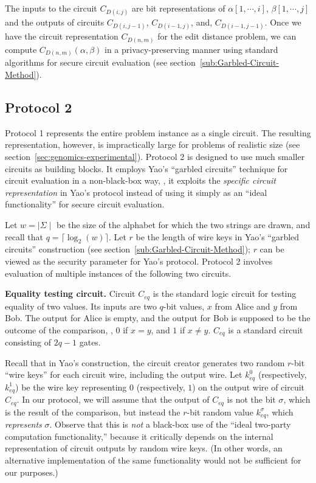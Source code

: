 The inputs to the circuit $C_{D(i,j)}$ are bit representations of
$\alpha[1,\cdots,i]$, $\beta[1,\cdots,j]$ and the outputs of circuits
$C_{D(i,j-1)}$, $C_{D(i-1,j)}$, and, $C_{D(i-1,j-1)}$.  Once we have
the circuit representation $C_{D(n,m)}$ for the edit distance problem,
we can compute $C_{D(n,m)}(\alpha,\beta)$ in a privacy-preserving
manner using standard algorithms for secure circuit evaluation (see
section~\ref{sub:Garbled-Circuit-Method}).


\subsection{Protocol 2}

Protocol 1 represents the entire problem instance as a single circuit.
The resulting representation, however, is impractically large for
problems of realistic size (see section~\ref{sec:genomics-experimental}).
Protocol 2 is designed to use much smaller circuits as building blocks.
It employs Yao's ``garbled circuits'' technique for circuit evaluation
in a non-black-box way, \ie, it exploits the \emph{specific circuit
representation} in Yao's protocol instead of using it simply as an
``ideal functionality'' for secure circuit evaluation.

Let $w=\mid \Sigma \mid$ be the size of the alphabet for which the two
strings are drawn, and recall that $q = \lceil \log_2 (w) \rceil$.
Let $r$ be the length of wire keys in Yao's ``garbled circuits''
construction (see section~\ref{sub:Garbled-Circuit-Method}); $r$ can be viewed as the security
parameter for Yao's protocol.  Protocol 2 involves evaluation of multiple
instances of the following two circuits.

\newcommand{\CE}{C_{\mathit{eq}}}
\newcommand{\CM}{C_{\mathit{min3}}}

\vspace{1ex}
\noindent
\textbf{Equality testing circuit.}
Circuit $\CE$ is the standard logic circuit for testing equality of
two values.  Its inputs are two $q$-bit values, $x$ from Alice and $y$
from Bob.  The output for Alice is empty, and the output for Bob is
supposed to be the outcome of the comparison, \ie, $0$ if $x=y$, and $1$
if $x \neq y$. $\CE$ is a standard circuit consisting of $2q-1$ gates.

Recall that in Yao's construction, the circuit creator generates
two random $r$-bit ``wire keys'' for each circuit wire, including the
output wire.  Let $k^0_{\mathit{eq}}$ (respectively, $k^1_{\mathit{eq}}$)
be the wire key representing $0$ (respectively, $1$) on the output wire
of circuit $\CE$.  In our protocol, we will assume that the output of
$\CE$ is not the bit $\sigma$, which is the result of the comparison,
but instead the $r$-bit random value $k^{\sigma}_{\mathit{eq}}$, which
\emph{represents} $\sigma$.  Observe that this is \emph{not} a black-box
use of the ``ideal two-party computation functionality,'' because it
critically depends on the internal representation of circuit outputs
by random wire keys.  (In other words, an alternative implementation of
the same functionality would not be sufficient for our purposes.)

